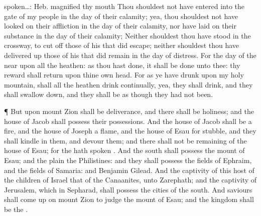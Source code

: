 {{spoken…: Heb. magnified thy mouth} Thou shouldest not have entered into the
gate of my people in the day of their calamity; yea, thou shouldest not have
looked on their affliction in the day of their calamity, nor have laid
{} on their substance in the day of their calamity; Neither shouldest thou have stood in the
crossway, to cut off those of his that did escape; neither shouldest thou have delivered
up those of his that did remain in the day of
distress. For the day of the
{}
{} near upon all the heathen: as thou hast done, it shall be done unto thee: thy
reward shall return upon thine own head. For as ye have drunk upon my holy
mountain, {} shall all the heathen drink continually, yea, they shall
drink, and they shall swallow down, and they shall be as though they had
not been. \par }{\PP {}¶ But upon
mount Zion shall be deliverance, and there shall be holiness; and the house of
Jacob shall possess their possessions. And the house of Jacob shall be a fire, and the
house of Joseph a flame, and the house of Esau for stubble, and they shall
kindle in them, and devour them; and there shall not be {} remaining of the
house of Esau; for the
{} hath spoken
{}. And {} the south shall possess the mount of Esau; and
{} the plain the Philistines: and they shall possess the fields of
Ephraim, and the fields of Samaria: and Benjamin {} Gilead.
And the captivity of this host of the children of Israel
{} that of the Canaanites, {} unto Zarephath; and the
captivity of Jerusalem, which {} in Sepharad, shall possess the cities of the
south. And
saviours shall come up on mount Zion to judge the mount of Esau; and the
kingdom shall be the
{}.
\par }
